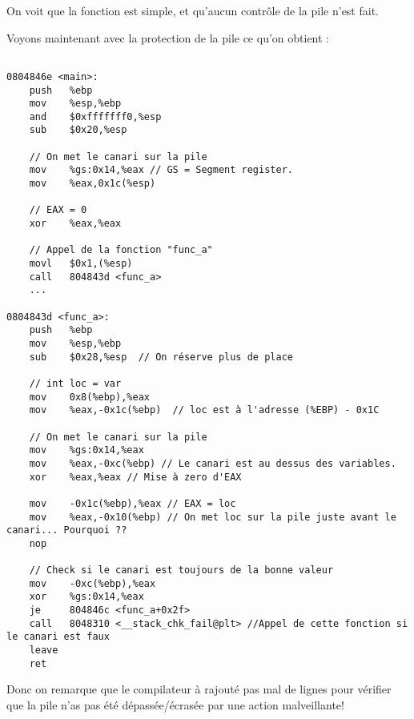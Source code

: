 On voit que la fonction est simple, et qu'aucun contrôle de la pile n'est fait. 

\pagebreak Voyons maintenant avec la protection de la pile ce qu'on obtient :
\begin{lstlisting}[frame=single,style=C]  % Start your code-block

0804846e <main>:
	push   %ebp
	mov    %esp,%ebp
	and    $0xfffffff0,%esp
	sub    $0x20,%esp
	
	// On met le canari sur la pile
	mov    %gs:0x14,%eax // GS = Segment register.
	mov    %eax,0x1c(%esp) 
	
	// EAX = 0
	xor    %eax,%eax
	
	// Appel de la fonction "func_a"
	movl   $0x1,(%esp)
	call   804843d <func_a>
	...
	
0804843d <func_a>:
	push   %ebp
	mov    %esp,%ebp
	sub    $0x28,%esp  // On réserve plus de place
	
	// int loc = var
	mov    0x8(%ebp),%eax
	mov    %eax,-0x1c(%ebp)  // loc est à l'adresse (%EBP) - 0x1C 
	
	// On met le canari sur la pile
	mov    %gs:0x14,%eax  
	mov    %eax,-0xc(%ebp) // Le canari est au dessus des variables. 
	xor    %eax,%eax // Mise à zero d'EAX
	
	mov    -0x1c(%ebp),%eax // EAX = loc 
	mov    %eax,-0x10(%ebp) // On met loc sur la pile juste avant le canari... Pourquoi ??
	nop
	
	// Check si le canari est toujours de la bonne valeur
	mov    -0xc(%ebp),%eax
	xor    %gs:0x14,%eax
	je     804846c <func_a+0x2f>
	call   8048310 <__stack_chk_fail@plt> //Appel de cette fonction si le canari est faux
	leave  
	ret   
\end{lstlisting}

Donc on remarque que le compilateur à rajouté pas mal de lignes pour vérifier que la pile n'as pas été dépassée/écrasée par une action malveillante! 